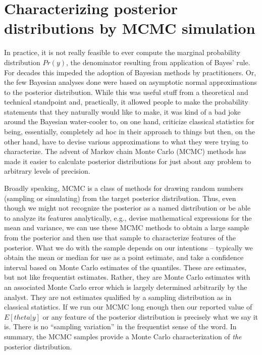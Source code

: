 \section{Characterizing posterior distributions by MCMC simulation}  

In practice, it is not really feasible to ever compute the marginal probability distribution $Pr(y)$, the denominator resulting from application of Bayes' rule. For decades this impeded the adoption of Bayesian methods by practitioners. Or, the few Bayesian analyses done were based on asymptotic normal approximations to the posterior distribution. While this was useful stuff from a theoretical and technical standpoint and, practically, it allowed people to make the probability statements that they naturally would like to make, it was kind of a bad joke around the Bayesian water-cooler to, on one hand, criticize classical statistics for being, essentially, completely ad hoc in their approach to things but then, on the other hand, have to devise various approximations to what they were trying to characterize. The advent of Markov chain Monte Carlo (MCMC) methods has made it easier to calculate posterior distributions for just about any problem to arbitrary levels of precision.  

Broadly speaking, MCMC is a class of methods for drawing random numbers (sampling or simulating) from the target posterior distribution.  Thus, even though we might not recognize the posterior as a named distribution or be able to analyze its features analytically, e.g., devise mathematical expressions for the mean and variance, we can use these MCMC methods to obtain a large sample from the posterior and then use that sample to characterize features of the posterior. What we do with the sample depends on our intentions -- typically we obtain the mean or median for use as a point estimate, and take a confidence interval based on Monte Carlo estimates of the quantiles.  These are estimates, but not like frequentist estimates. Rather, they are Monte Carlo estimates with an associated Monte Carlo error which is largely determined arbitrarily by the analyst. They are not estimates qualified by a sampling distribution as in classical statistics. If we run our MCMC long enough then our reported value of $E[theta|y]$ or any feature of the posterior distribution is precisely what we say it is. There is no ``sampling variation'' in the frequentist sense of the word.  In summary, the MCMC samples provide a Monte Carlo characterization of {\it the} posterior distribution.


